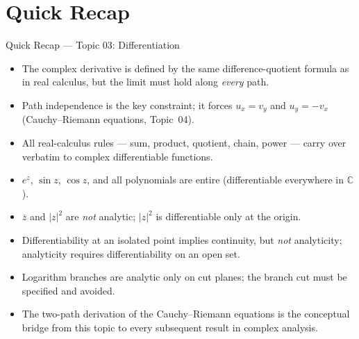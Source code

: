 \documentclass[12pt,a4paper]{article}
\begin{document}
\section{Quick Recap}

\begin{learnbox}{Quick Recap --- Topic 03: Differentiation}
\begin{itemize}[leftmargin=1.5em]
  \item The complex derivative is defined by the same difference-quotient formula as in
        real calculus, but the limit must hold along \emph{every} path.
  \item Path independence is the key constraint; it forces
        $u_x = v_y$ and $u_y = -v_x$ (Cauchy--Riemann equations, Topic~04).
  \item All real-calculus rules --- sum, product, quotient, chain, power --- carry over
        verbatim to complex differentiable functions.
  \item $e^z$, $\sin z$, $\cos z$, and all polynomials are entire (differentiable
        everywhere in $\mathbb{C}$).
  \item $\overline{z}$ and $|z|^2$ are \emph{not} analytic; $|z|^2$ is differentiable
        only at the origin.
  \item Differentiability at an isolated point implies continuity, but \emph{not}
        analyticity; analyticity requires differentiability on an open set.
  \item Logarithm branches are analytic only on cut planes; the branch cut must be
        specified and avoided.
  \item The two-path derivation of the Cauchy--Riemann equations is the conceptual
        bridge from this topic to every subsequent result in complex analysis.
\end{itemize}
\end{learnbox}
\end{document}
